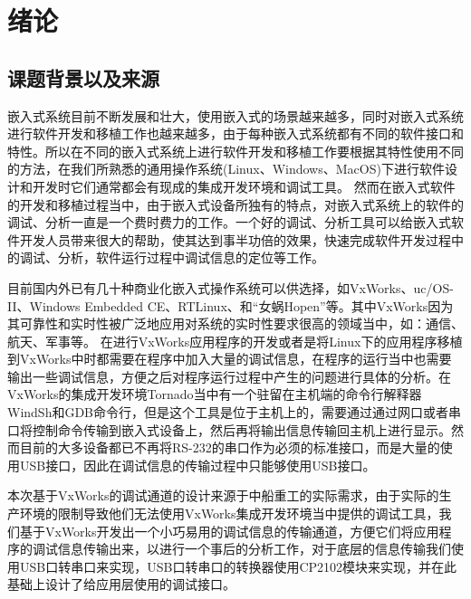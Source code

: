 \chapter{绪论}
\section{课题背景以及来源}
	嵌入式系统目前不断发展和壮大，使用嵌入式的场景越来越多，同时对嵌入式系统进行软件开发和移植工作也越来越多，由于每种嵌入式系统都有不同的软件接口和特性。所以在不同的嵌入式系统上进行软件开发和移植工作要根据其特性使用不同的方法，在我们所熟悉的通用操作系统(Linux、Windows、MacOS)下进行软件设计和开发时它们通常都会有现成的集成开发环境和调试工具。
	然而在嵌入式软件的开发和移植过程当中，由于嵌入式设备所独有的特点，对嵌入式系统上的软件的调试、分析一直是一个费时费力的工作。一个好的调试、分析工具可以给嵌入式软件开发人员带来很大的帮助，使其达到事半功倍的效果，快速完成软件开发过程中的调试、分析，软件运行过程中调试信息的定位等工作。
		
	目前国内外已有几十种商业化嵌入式操作系统可以供选择，如VxWorks、uc/OS-II、Windows Embedded CE、RTLinux、和“女蜗Hopen”等。其中VxWorks因为其可靠性和实时性被广泛地应用对系统的实时性要求很高的领域当中，如：通信、航天、军事等\cite{刘小军2008基于}。
	在进行VxWorks应用程序的开发或者是将Linux下的应用程序移植到VxWorks中时都需要在程序中加入大量的调试信息，在程序的运行当中也需要输出一些调试信息，方便之后对程序运行过程中产生的问题进行具体的分析。在VxWorks的集成开发环境Tornado当中有一个驻留在主机端的命令行解释器WindSh和GDB命令行，但是这个工具是位于主机上的，需要通过通过网口或者串口将控制命令传输到嵌入式设备上，然后再将输出信息传输回主机上进行显示。然而目前的大多设备都已不再将RS-232的串口作为必须的标准接口，而是大量的使用USB接口，因此在调试信息的传输过程中只能够使用USB接口。
	
	
	本次基于VxWorks的调试通道的设计来源于中船重工的实际需求，由于实际的生产环境的限制导致他们无法使用VxWorks集成开发环境当中提供的调试工具，我们基于VxWorks开发出一个小巧易用的调试信息的传输通道，方便它们将应用程序的调试信息传输出来，以进行一个事后的分析工作，对于底层的信息传输我们使用USB口转串口来实现，USB口转串口的转换器使用CP2102模块来实现，并在此基础上设计了给应用层使用的调试接口。
	
		
			
